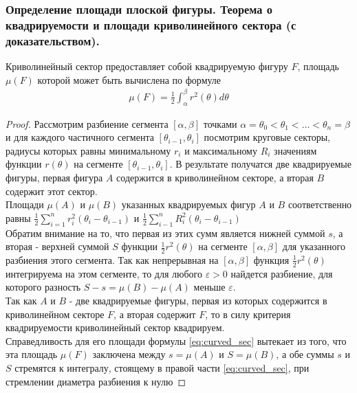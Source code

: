 \documentclass[10pt]{article}
\begin{document}
    \subsubsection{Определение площади плоской фигуры. Теорема о квадрируемости и площади криволинейного сектора (с доказательством).}
    \begin{definition}
    \end{definition}
    \begin{corollary}
        Криволинейный сектор предоставляет собой квадрируемую фигуру $F$, площадь $\mu(F)$ которой может быть вычислена по формуле
        \begin{gather*}
            \mu(F) = \frac{1}{2} \int_{\alpha}^{\beta} r^2 (\theta) d \theta \label{eq:curved_sec}
        \end{gather*}
    \end{corollary}
    \begin{proof}
        Рассмотрим разбиение сегмента $[\alpha, \beta]$ точками $\alpha = \theta_0 < \theta_1 < \ldots < \theta_n = \beta$ и для каждого частичного сегмента $[\theta_{i-1}, \theta_i]$ посмотрим круговые секторы, радиусы которых равны минимальному $r_i$ и максимальному $R_i$ значениям функции $r(\theta)$ на сегменте $[\theta_{i-1}, \theta_i]$. В результате получатся две квадрируемые фигуры, первая фигура $A$ содержится в криволинейном секторе, а вторая $B$ содержит этот сектор.\\
        Площади $\mu(A)$ и $\mu(B)$ указанных квадрируемых фигур $A$ и $B$ соответственно равны $\frac{1}{2} \sum_{i=1}^n r_i^2 (\theta_i - \theta_{i-1})$ и $\frac{1}{2} \sum_{i-1}^n R_i^2(\theta_i - \theta_{i-1})$\\
        Обратим внимание на то, что первая из этих сумм является нижней суммой $s$, а вторая - верхней суммой $S$ функции $\frac{1}{2} r^2 (\theta)$ на сегменте $[\alpha, \beta]$ для указанного разбиения этого сегмента. Так как непрерывная на $[\alpha, \beta]$ функция $\frac{1}{2} r^2 (\theta)$ интегрируема на этом сегменте, то для любого $\varepsilon > 0$ найдется разбиение, для которого разность $S - s = \mu(B) - \mu(A)$ меньше $\varepsilon$.\\
        Так как $A$ и $B$ - две квадрируемые фигуры, первая из которых содержится в криволинейном секторе $F$, а вторая содержит $F$, то в силу критерия квадрируемости криволинейный сектор квадрируем.\\
        Справедливость для его площади формулы \ref{eq:curved_sec} вытекает из того, что эта площадь $\mu(F)$ заключена между $s = \mu(A)$ и $S = \mu(B)$, а обе суммы $s$ и $S$ стремятся к интегралу, стоящему в правой части \ref{eq:curved_sec}, при стремлении диаметра разбиения к нулю
    \end{proof}
\end{document}
